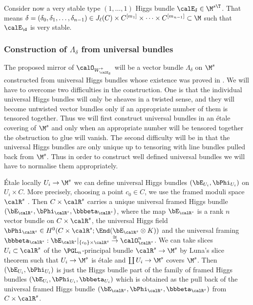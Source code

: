Consider now a very stable type $(1,\dots,1)$ Higgs bundle
$\calE_\delta\in \M^{s\T}$. That means  $\delta=(\delta_0,\delta_1,\dots,\delta_{n-1}) \in J_\ell(C)\times C^{[m_1]}\times \dots \times C^{[m_{n-1}]}\subset \M$ such that $\calE_{\d}$ is very stable. %





\subsubsection{Construction of $\Lambda_\delta$ from universal bundles}
\label{lambdadelta}
The proposed mirror of $\calO_{W^+_{\calE_\delta}}$ will be a vector bundle $\Lambda_\delta$ on $\M^s$ constructed from universal Higgs bundles whose existence was proved in \cite{simpson}. We will have to overcome two difficulties in the construction. One is that the individual universal Higgs bundles will only be sheaves in a twisted sense, and they will become untwisted vector bundles only if an appropriate number of them is tensored together. Thus we will first construct universal bundles in an \'etale covering of $\M^s$ and only when an appropriate number will be tensored together the obstruction to glue will vanish. The second difficulty will be in that the universal Higgs bundles are only unique up to tensoring with line bundles pulled back from $\M^s$. Thus in order to construct well defined universal bundles we will have to normalise them appropriately.


\'Etale locally $U_i\to \M^s$ we can define  \cite[Theorem 4.7.(4)]{simpson1} universal Higgs bundles $(\bE_{U_i},\bPhi_{U_i})$ on $U_i\times C$.  More precisely,  choosing a point $c_0\in C$, we use the framed moduli space $\calR^s$ \cite[Theorem 4.10]{simpson1}. Then  $C\times \calR^s$ carries  a unique universal framed Higgs bundle $(\bE_{\calR^s},\bPhi_{\calR^s},\bbbeta_{\calR^s})$, where the map $\bE_{\calR^s}$ is a rank $n$ vector bundle on $C\times \calR^s$, the universal Higgs field $\bPhi_{\calR^s}\in H^0(C\times\calR^s; \End(\bE_{\calR^s}\otimes K))$ and the universal framing $\bbbeta_{\calR^s}:\bE_{\calR^s}|_{\{c_0\}\times \calR^s}\stackrel{\cong}{\to} \calO_{\calR^s}^n$. We can take slices $U_i\subset \calR^s$ of the $\PGL_n$-principal bundle $\calR^s\to \M^s$ by  Luna's slice theorem \cite[Theorem III.1]{luna} such that $U_i\to \M^s$ is \'etale and $\coprod U_i \to \M^s$ covers $\M^s$. Then $(\bE_{U_i},\bPhi_{U_i})$ is just the Higgs bundle part of the family of framed Higgs bundles $(\bE_{U_i},\bPhi_{U_i},\bbbeta_{U_i})$ which is obtained as the pull back of the universal framed Higgs bundle $(\bE_{\calR^s},\bPhi_{\calR^s},\bbbeta_{\calR^s})$ from $C\times \calR^s$.

